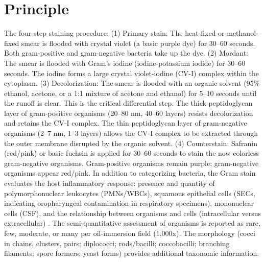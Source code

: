 \section*{Principle}
The four-step staining procedure: (1) Primary stain: The heat-fixed or methanol-fixed smear is flooded with crystal violet (a basic purple dye) for 30--60 seconds. Both gram-positive and gram-negative bacteria take up the dye. (2) Mordant: The smear is flooded with Gram's iodine (iodine-potassium iodide) for 30--60 seconds. The iodine forms a large crystal violet-iodine (CV-I) complex within the cytoplasm. (3) Decolorization: The smear is flooded with an organic solvent (95\% ethanol, acetone, or a 1:1 mixture of acetone and ethanol) for 5--10 seconds until the runoff is clear. This is the critical differential step. The thick peptidoglycan layer of gram-positive organisms (20--80 nm, 40--60 layers) resists decolorization and retains the CV-I complex. The thin peptidoglycan layer of gram-negative organisms (2--7 nm, 1--3 layers) allows the CV-I complex to be extracted through the outer membrane disrupted by the organic solvent. (4) Counterstain: Safranin (red/pink) or basic fuchsin is applied for 30--60 seconds to stain the now colorless gram-negative organisms. Gram-positive organisms remain purple; gram-negative organisms appear red/pink. In addition to categorizing bacteria, the Gram stain evaluates the host inflammatory response: presence and quantity of polymorphonuclear leukocytes (PMNs/WBCs), squamous epithelial cells (SECs, indicating oropharyngeal contamination in respiratory specimens), mononuclear cells (CSF), and the relationship between organisms and cells (intracellular versus extracellular) \cite{murray2019manual}. The semi-quantitative assessment of organisms is reported as rare, few, moderate, or many per oil-immersion field (1,000x). The morphology (cocci in chains, clusters, pairs; diplococci; rods/bacilli; coccobacilli; branching filaments; spore formers; yeast forms) provides additional taxonomic information.

